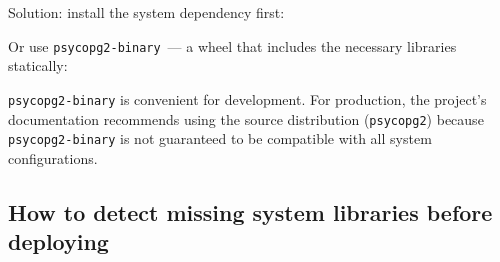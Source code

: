 \noindent{}Solution: install the system dependency first:

\begin{codebox}[short]

\begin{Shaded}
\begin{Highlighting}[]
\end{Highlighting}
\end{Shaded}

\end{codebox}

\noindent{}Or use \texttt{psycopg2-binary}~--- a wheel that includes the necessary libraries statically:

\begin{codebox}[short]

\begin{Shaded}
\begin{Highlighting}[]
\end{Highlighting}
\end{Shaded}

\end{codebox}

\noindent{}\texttt{psycopg2-binary} is convenient for development. For production, the project's documentation recommends using the source distribution (\texttt{psycopg2}) because \texttt{psycopg2-binary} is not guaranteed to be compatible with all system configurations.

\subsection*{How to detect missing system libraries before deploying}\label{07-environment-drift:how-to-detect-missing-system-libraries-before-deploying}

